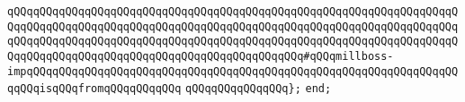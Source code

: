 \verb|qQQqqQQqqQQqqQQqqQQqqQQqqQQqqQQqqQQqqQQqqQQqqQQqqQQqqQQqqQQqqQQqqQQqqQQqqQQqqQQqqQQqqQQqqQQqqQQqqQQqqQQqqQQqqQQqqQQqqQQqqQQqqQQqqQQqqQQqqQQqqQQqqQQqqQQqqQQqqQQqqQQqqQQqqQQqqQQqqQQqqQQqqQQqqQQqqQQqqQQqqQQqqQQqqQQqqQQqqQQqqQQqqQQqqQQqqQQqqQQqqQQqqQQqqQQqqQQq#qQQqmillboss-impqQQqqQQqqQQqqQQqqQQqqQQqqQQqqQQqqQQqqQQqqQQqqQQqqQQqqQQqqQQqqQQqqQQqqQQqisqQQqfromqQQqqQQqqQQq|\newline
\verb|qQQqqQQqqQQqqQQq};|\newline
\newline
\verb|end;|\newline
\newline
\newline
\newline
\newline

